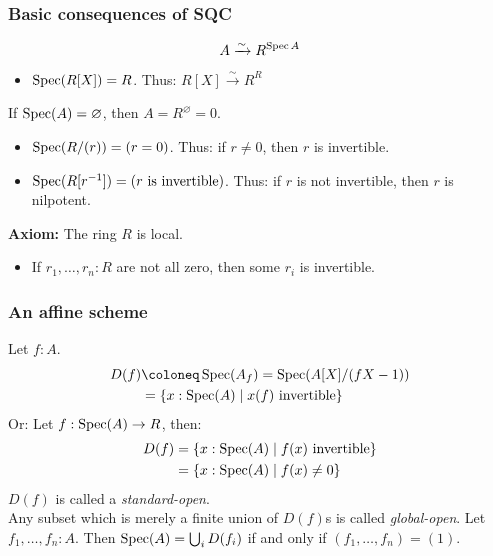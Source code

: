 \documentclass{beamer}
\begin{document}
\begin{frame}
  \frametitle{Basic consequences of SQC}

  \[ A \xrightarrow{\sim} R^{\operatorname{Spec} A}\]

  \vspace{5mm}
  \begin{itemize}
    \item
      $\operatorname{Spec}(R[X]) = R$.
      Thus:
      $R[X] \xrightarrow{\sim} R^R$
  \end{itemize}

  \pause
  \vspace{5mm}
  If $\operatorname{Spec}(A) = \varnothing$,
  then $A = R^\varnothing = 0$.

  \vspace{2.5mm}
  \begin{itemize}
    \item
      $\operatorname{Spec}(R/(r)) = (r = 0)$.
      Thus:
      if $r \neq 0$,
      then $r$ is invertible.
    \item
      $\operatorname{Spec}(R[r^{-1}]) = (\text{$r$ is invertible})$.
      Thus:
      if $r$ is not invertible,
      then $r$ is nilpotent.
  \end{itemize}

  \pause
  \vspace{5mm}
  \textbf{Axiom:} The ring $R$ is local.

  \vspace{2.5mm}
  \begin{itemize}
    \item      If $r_1, \dots, r_n : R$ are not all zero,
      then some $r_i$ is invertible.
  \end{itemize}
\end{frame}

\begin{frame}
  \frametitle{An affine scheme}
  Let $f:A$.
  \begin{align*}
    D(f)&\coloneq\Spec(A_f)=\Spec(A[X]/(fX-1)) \\
        &=\{x:\Spec(A)\mid x(f)\text{ invertible}\} 
  \end{align*}
  \pause
  Or: Let $f:\operatorname{Spec}(A)\to R$, then:
  \begin{align*}
    D(f)&=\{x:\operatorname{Spec}(A)\mid f(x)\text{ invertible}\} \\
        &=\{x:\operatorname{Spec}(A)\mid f(x)\neq 0\}
  \end{align*}
  \pause
  $D(f)$ is called a \emph{standard-open}. \\
  \pause
  Any subset which is merely a finite union of $D(f)$s is called \emph{global-open}.
  \vspace{0.2cm}
  \pause
  Let $f_1,\dots,f_n:A$. Then $\operatorname{Spec}(A)=\bigcup_i D(f_i)$ if and only if $(f_1,\dots,f_n)=(1)$.
\end{frame}
\end{document}
